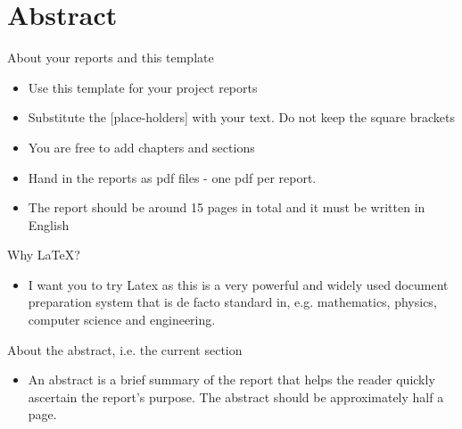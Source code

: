\chapter*{Abstract}

About your reports and this template
\begin{itemize}
\item Use this template for your project reports
\item Substitute the [place-holders] with your text. Do not keep the square brackets
\item You are free to add chapters and sections
\item Hand in the reports as pdf files - one pdf per report.
\item The report should be around 15 pages in total and it must be
  written in English
\end{itemize}

Why \LaTeX?
\begin{itemize}
\item I want you to try Latex as this is a very powerful and widely
  used document preparation system that is de facto standard in,
  e.g. mathematics, physics, computer science and engineering.
\end{itemize}

About the abstract, i.e. the current section
\begin{itemize}
\item An abstract is a brief summary of the report that helps the
  reader quickly ascertain the report's purpose. The abstract should
  be approximately half a page.
\end{itemize}